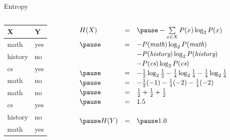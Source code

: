 \documentclass[14pt]{beamer}
\begin{document}
\begin{frame}{Entropy}
\begin{columns}
\begin{column}{1.1in}
\begin{tabular}{ll}
X       & Y   \\
\hline
math    & yes \\
history & no  \\
cs      & yes \\
math    & no  \\
math    & no  \\
cs      & yes \\
history & no  \\
math    & yes \\
\end{tabular}
\end{column}
\begin{column}{3.1in}
\pause
$
\extrarowheight=2pt
\begin{array}{lll}
H(X)        & = & \pause -\sum\limits_{x \in X}P(x)\log_2 P(x) \\
     \pause & = & -P(\textit{math})\log_2 P(\textit{math}) \\
            &   & -P(\textit{history})\log_2 P(\textit{history}) \\
            &   & -P(\textit{cs})\log_2 P(\textit{cs}) \\
     \pause & = & -\frac{1}{2}\log_2\frac{1}{2} 
                  -\frac{1}{4}\log_2\frac{1}{4}
                  -\frac{1}{4}\log_2\frac{1}{4} \\
     \pause & = & -\frac{1}{2}(-1) - \frac{1}{4}(-2) - \frac{1}{4}(-2) \\
     \pause & = & \frac{1}{2} + \frac{1}{2} + \frac{1}{2} \\
     \pause & = & 1.5 \\
\\
\pause
H(Y)        & = & \pause 1.0 \\
\end{array}
$
\end{column}
\end{columns}
\end{frame}
\end{document}
